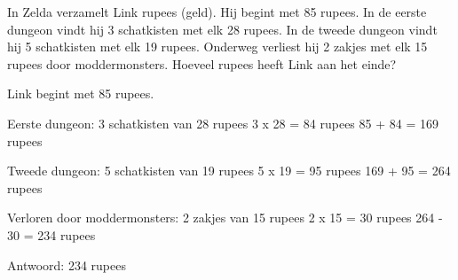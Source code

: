 \begin{opgave}
In Zelda verzamelt Link rupees (geld). Hij begint met 85 rupees. In de eerste 
dungeon vindt hij 3 schatkisten met elk 28 rupees. In de tweede dungeon vindt 
hij 5 schatkisten met elk 19 rupees. Onderweg verliest hij 2 zakjes met elk 
15 rupees door moddermonsters. Hoeveel rupees heeft Link aan het einde?
\end{opgave}

\begin{oplossing}
Link begint met 85 rupees.

Eerste dungeon: 3 schatkisten van 28 rupees
3 x 28 = 84 rupees
85 + 84 = 169 rupees

Tweede dungeon: 5 schatkisten van 19 rupees
5 x 19 = 95 rupees
169 + 95 = 264 rupees

Verloren door moddermonsters: 2 zakjes van 15 rupees
2 x 15 = 30 rupees
264 - 30 = 234 rupees

Antwoord: 234 rupees
\end{oplossing}